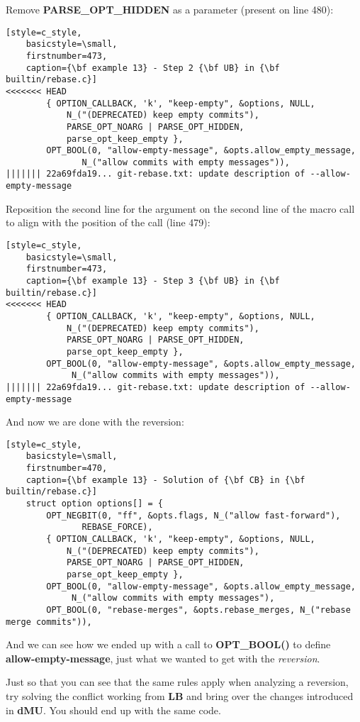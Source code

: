 Remove {\bf PARSE\_OPT\_HIDDEN} as a parameter (present on line 480):
\begin{lstlisting}[style=c_style,
	basicstyle=\small,
	firstnumber=473,
	caption={\bf example 13} - Step 2 {\bf UB} in {\bf builtin/rebase.c}]
<<<<<<< HEAD
		{ OPTION_CALLBACK, 'k', "keep-empty", &options, NULL,
			N_("(DEPRECATED) keep empty commits"),
			PARSE_OPT_NOARG | PARSE_OPT_HIDDEN,
			parse_opt_keep_empty },
		OPT_BOOL(0, "allow-empty-message", &opts.allow_empty_message,
			   N_("allow commits with empty messages")),
||||||| 22a69fda19... git-rebase.txt: update description of --allow-empty-message
\end{lstlisting}

Reposition the second line for the argument on the second line of the macro call to align with
the position of the call (line 479):
\begin{lstlisting}[style=c_style,
	basicstyle=\small,
	firstnumber=473,
	caption={\bf example 13} - Step 3 {\bf UB} in {\bf builtin/rebase.c}]
<<<<<<< HEAD
		{ OPTION_CALLBACK, 'k', "keep-empty", &options, NULL,
			N_("(DEPRECATED) keep empty commits"),
			PARSE_OPT_NOARG | PARSE_OPT_HIDDEN,
			parse_opt_keep_empty },
		OPT_BOOL(0, "allow-empty-message", &opts.allow_empty_message,
			 N_("allow commits with empty messages")),
||||||| 22a69fda19... git-rebase.txt: update description of --allow-empty-message
\end{lstlisting}

And now we are done with the reversion:

\begin{lstlisting}[style=c_style,
	basicstyle=\small,
	firstnumber=470,
	caption={\bf example 13} - Solution of {\bf CB} in {\bf builtin/rebase.c}]
	struct option options[] = {
		OPT_NEGBIT(0, "ff", &opts.flags, N_("allow fast-forward"),
			   REBASE_FORCE),
		{ OPTION_CALLBACK, 'k', "keep-empty", &options, NULL,
			N_("(DEPRECATED) keep empty commits"),
			PARSE_OPT_NOARG | PARSE_OPT_HIDDEN,
			parse_opt_keep_empty },
		OPT_BOOL(0, "allow-empty-message", &opts.allow_empty_message,
			 N_("allow commits with empty messages"),
		OPT_BOOL(0, "rebase-merges", &opts.rebase_merges, N_("rebase merge commits")),
\end{lstlisting}

And we can see how we ended up with a call to {\bf OPT\_BOOL()} to define {\bf allow-empty-message}, just what we wanted
to get with the {\it reversion}.

Just so that you can see that the same rules apply when analyzing a reversion, try solving the conflict working from {\bf LB}
and bring over the changes introduced in {\bf dMU}. You should end up with the same code.

